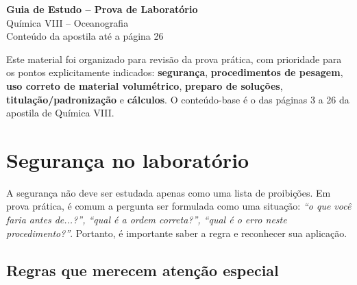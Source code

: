 \documentclass[a4paper,12pt]{article}
\begin{document}
\begin{center}
    {\LARGE\bfseries Guia de Estudo -- Prova de Laboratório}\\[0.4em]
    {\large Química VIII -- Oceanografia}\\[0.4em]
    {\normalsize Conteúdo da apostila até a página 26}
\end{center}

\vspace{0.5em}

\begin{atencao}
Este material foi organizado para revisão da prova prática, com prioridade para os pontos explicitamente indicados: \textbf{segurança}, \textbf{procedimentos de pesagem}, \textbf{uso correto de material volumétrico}, \textbf{preparo de soluções}, \textbf{titulação/padronização} e \textbf{cálculos}. O conteúdo-base é o das páginas 3 a 26 da apostila de Química VIII.
\end{atencao}

\tableofcontents
\newpage

\section{Segurança no laboratório}

A segurança não deve ser estudada apenas como uma lista de proibições. Em prova prática, é comum a pergunta ser formulada como uma situação: \emph{``o que você faria antes de...?'', ``qual é a ordem correta?'', ``qual é o erro neste procedimento?''}. Portanto, é importante saber a regra e reconhecer sua aplicação.

\subsection{Regras que merecem atenção especial}
\end{document}
